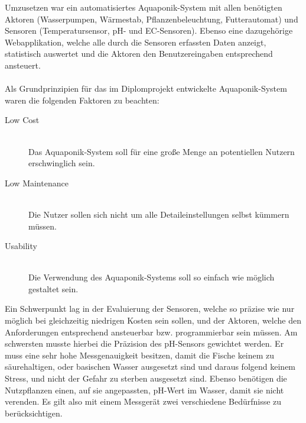 
Umzusetzen war ein automatisiertes Aquaponik-System mit allen benötigten Aktoren (Wasserpumpen, Wärmestab, Pflanzenbeleuchtung, Futterautomat) und Sensoren (Temperatursensor, pH- und EC-Sensoren). Ebenso eine dazugehörige Webapplikation, welche alle durch die Sensoren erfassten Daten anzeigt, statistisch auswertet und die Aktoren den Benutzereingaben entsprechend ansteuert.\\ \mbox{} \\
Als Grundprinzipien für das im Diplomprojekt entwickelte Aquaponik-System waren die folgenden Faktoren zu beachten:\mbox{} \\
\begin{description}
    \item [Low Cost]\mbox{} \\ Das Aquaponik-System soll für eine große Menge an potentiellen Nutzern erschwinglich sein. 
    \item [Low Maintenance]\mbox{} \\ Die Nutzer sollen sich nicht um alle Detaileinstellungen selbst kümmern müssen.
    \item [Usability]\mbox{} \\ Die Verwendung des Aquaponik-Systems soll so einfach wie möglich gestaltet sein.
\end{description}

Ein Schwerpunkt lag in der Evaluierung der Sensoren, welche so präzise wie nur möglich bei gleichzeitig niedrigen Kosten sein sollen, und der Aktoren, welche den Anforderungen entsprechend ansteuerbar bzw. programmierbar sein müssen. Am schwersten musste hierbei die Präzision des pH-Sensors gewichtet werden. Er muss eine sehr hohe Messgenauigkeit besitzen, damit die Fische keinem zu säurehaltigen, oder basischen Wasser ausgesetzt sind und daraus folgend keinem Stress, und nicht der Gefahr zu sterben ausgesetzt sind. Ebenso benötigen die Nutzpflanzen einen, auf sie angepassten, pH-Wert im Wasser, damit sie nicht verenden. Es gilt also mit einem Messgerät zwei verschiedene Bedürfnisse zu berücksichtigen.